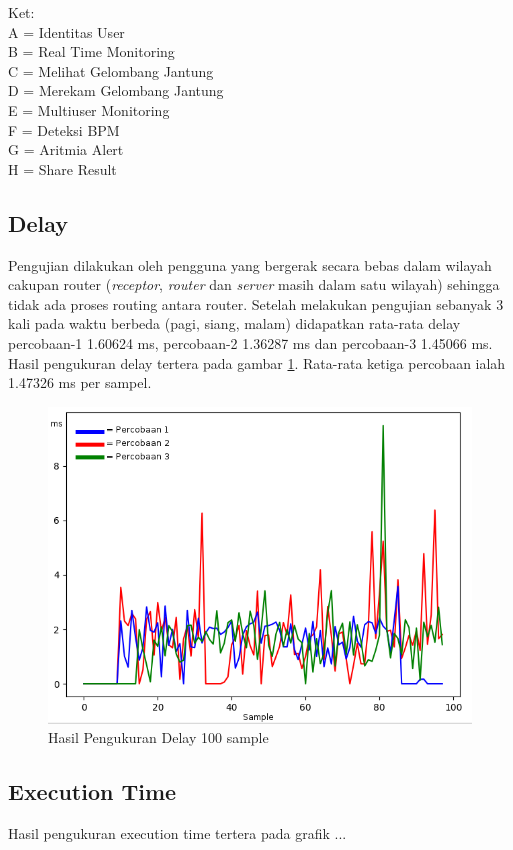 Ket: \\
A = Identitas User \\
B = Real Time Monitoring \\
C = Melihat Gelombang Jantung \\
D = Merekam Gelombang Jantung \\
E = Multiuser Monitoring \\
F = Deteksi BPM \\
G = Aritmia Alert \\
H = Share Result \\

\subsection{Delay}
Pengujian dilakukan oleh pengguna yang bergerak secara bebas dalam wilayah cakupan router (\textit{receptor}, \textit{router} dan \textit{server} masih dalam satu wilayah) sehingga tidak ada proses routing antara router. Setelah melakukan pengujian sebanyak 3 kali pada waktu berbeda (pagi, siang, malam) didapatkan rata-rata delay percobaan-1 1.60624 ms, percobaan-2 1.36287 ms dan percobaan-3 1.45066 ms. Hasil pengukuran delay tertera pada gambar \ref{fig:delay}. Rata-rata ketiga percobaan ialah 1.47326 ms per sampel.

\begin{figure}[H]
	\centering
	\includegraphics[scale=0.5]{images/delay1.png}
	\caption{Hasil Pengukuran Delay 100 sample}
	\label{fig:delay}
\end{figure}

\subsection{Execution Time}
Hasil pengukuran execution time tertera pada grafik ...

